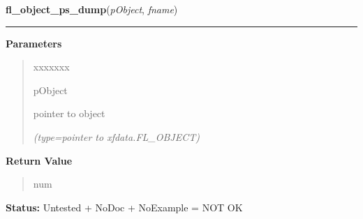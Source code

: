     \vspace{0.5ex}

\hspace{.8\funcindent}\begin{boxedminipage}{\funcwidth}

    \raggedright \textbf{fl\_object\_ps\_dump}(\textit{pObject}, \textit{fname})

    \vspace{-1.5ex}

    \rule{\textwidth}{0.5\fboxrule}
\setlength{\parskip}{2ex}
\setlength{\parskip}{1ex}
      \textbf{Parameters}
      \vspace{-1ex}

      \begin{quote}
        \begin{Ventry}{xxxxxxx}

          \item[pObject]

          pointer to object

            {\it (type=pointer to xfdata.FL\_OBJECT)}

        \end{Ventry}

      \end{quote}

      \textbf{Return Value}
    \vspace{-1ex}

      \begin{quote}
      num

      \end{quote}

\textbf{Status:} Untested + NoDoc + NoExample = NOT OK



    \end{boxedminipage}

    \label{xformslib:library:fl_addto_formbrowser}

    \vspace{0.5ex}

